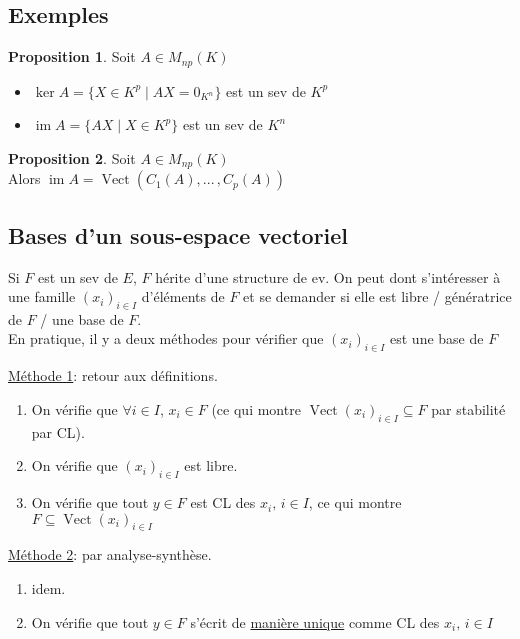 \documentclass[10pt,a4paper]{article}
\theoremstyle{definition}
\newtheorem{proposition}{Proposition}[section]
\DeclareMathOperator{\vect}{Vect}
\DeclareMathOperator{\im}{im}
\begin{document}
\subsection{Exemples}
\begin{proposition}
Soit $A \in M_{np}(K)$
\begin{itemize}
\item $\ker A = \{ X \in K^p \mid AX = 0_{K^n} \}$ est un sev de $K^p$
\item $\im A = \{ AX \mid X \in K^p \}$ est un sev de $K^n$
\end{itemize}
\end{proposition}
\begin{proposition}
Soit $A \in M_{np}(K)$ \\
Alors $\im A = \vect(C_1(A), ...\, , C_p(A))$
\end{proposition}

\subsection{Bases d'un sous-espace vectoriel}
Si $F$ est un sev de $E$, $F$ hérite d'une structure de ev. On peut dont s'intéresser à une famille $(x_i)_{i \in I}$ d'éléments de $F$ et se demander si elle est libre / génératrice de $F$ / une base de $F$. \\
En pratique, il y a deux méthodes pour vérifier que $(x_i)_{i \in I}$ est une base de $F$ \vspace{1em}

\uline{Méthode 1}: retour aux définitions.
\begin{enumerate}
\item[0.] On vérifie que $\forall i \in I$, $x_i \in F$ (ce qui montre $\vect(x_i)_{i \in I} \subseteq F$ par stabilité par CL).
\item[1.] On vérifie que $(x_i)_{i \in I}$ est libre.
\item[2.] On vérifie que tout $y \in F$ est CL des $x_i,\, i \in I$, ce qui montre $F \subseteq \vect(x_i)_{i \in I}$
\end{enumerate} \medskip

\uline{Méthode 2}: par analyse-synthèse.
\begin{enumerate}
\item[0.] idem.
\item[1.] On vérifie que tout $y \in F$ s'écrit de \uline{manière unique} comme CL des $x_i,\, i \in I$
\end{enumerate}
\end{document}
